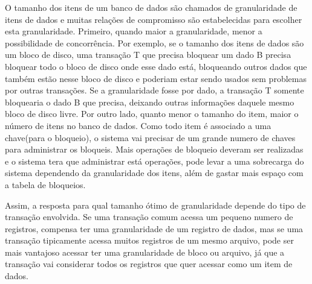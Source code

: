 \documentclass[a4paper,10pt]{article}
\begin{document}
O tamanho dos itens de um banco de dados são chamados de granularidade de itens de dados e muitas relações de compromisso são estabelecidas para escolher esta granularidade.
Primeiro, quando maior a granularidade, menor a possibilidade de concorrência. Por exemplo, se o tamanho dos itens de dados são um bloco de disco, uma transação T que precisa bloquear um dado B precisa bloquear todo o bloco de disco onde esse dado está, bloqueando outros dados que também estão nesse bloco de disco e poderiam estar sendo usados sem problemas por outras transações. Se a granularidade fosse por dado, a transação T somente bloquearia o dado B que precisa, deixando outras informações daquele mesmo bloco de disco livre. Por outro lado, quanto menor o tamanho do item, maior o número de itens no banco de dados. Como todo item é associado a uma chave(para o bloqueio), o sistema vai precisar de um grande numero de chaves para administrar os bloqueis. Mais operações de bloqueio deveram ser realizadas e o sistema tera que administrar está operações, pode levar a uma sobrecarga do sistema dependendo da granularidade dos itens, além de gastar mais espaço com a tabela de bloqueios.

Assim, a resposta para qual tamanho ótimo de granularidade depende do tipo de transação envolvida. Se uma transação comum acessa um pequeno numero de registros, compensa ter uma granularidade de um registro de dados, mas se uma transação tipicamente acessa muitos registros de um mesmo arquivo, pode ser mais vantajoso acessar ter uma granularidade de bloco ou arquivo, já que a transação vai considerar todos os registros que quer acessar como um item de dados.
\end{document}
